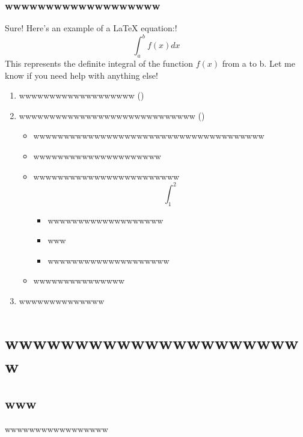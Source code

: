 \documentclass[11pt,aspectratio=1610,spanish]{beamer}
\begin{document}
\subsubsection{wwwwwwwwwwwwwwwwwww}

\begin{frame}

	Sure! Here's an example of a LaTeX equation:!
	\[ \int_{a}^{b} f(x)dx \]
	This represents the definite integral of the function $ f(x) $ from a to b. Let me know if you need help with anything else!

	\begin{enumerate}[<+->]
		\item wwwwwwwwwwwwwwwwwww (\cite{Hatcher:478079})
		      \cite{einstein}
		\item wwwwwwwwwwwwwwwwwwwwwwwwwwwww (\cite{dirac})
		      \begin{itemize}
			      \item wwwwwwwwwwwwwwwwwwwwwwwwwwwwwwwwwwwwww
			      \item wwwwwwwwwwwwwwwwwwwww
			      \item wwwwwwwwwwwwwwwwwwwwwwww
			            \[ \int_{1}^{2} \]
			            \begin{itemize}
				            \item wwwwwwwwwwwwwwwwwww
				            \item www
				            \item wwwwwwwwwwwwwwwwwwww
			            \end{itemize}
			      \item wwwwwwwwwwwwwww
		      \end{itemize}
		\item wwwwwwwwwwwwww
	\end{enumerate}
\end{frame}



\section{wwwwwwwwwwwwwwwwwwwwww}
\subsection{www}
\begin{frame}
	wwwwwwwwwwwwwwwww
\end{frame}
\end{document}
